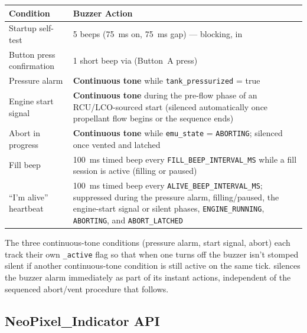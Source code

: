 ﻿\documentclass[11pt,letterpaper]{article}
\begin{document}
\begin{center}
\begin{tabularx}{\textwidth}{@{}lY@{}}
\toprule
Condition & Buzzer Action \\
\midrule
Startup self-test            & 5 beeps (75~ms on, 75~ms gap) --- blocking, in  \\
Button press confirmation    & 1 short beep via  (Button~A press) \\
Pressure alarm                & \textbf{Continuous tone} while \texttt{tank\_pressurized} = true \\
Engine start signal            & \textbf{Continuous tone} during the pre-flow phase of an RCU/LCO-sourced start (silenced automatically once propellant flow begins or the sequence ends) \\
Abort in progress              & \textbf{Continuous tone} while \texttt{emu\_state} = \texttt{ABORTING}; silenced once vented and latched \\
Fill beep                      & 100~ms timed beep every \texttt{FILL\_BEEP\_INTERVAL\_MS} while a fill session is active (filling or paused) \\
``I'm alive'' heartbeat        & 100~ms timed beep every \texttt{ALIVE\_BEEP\_INTERVAL\_MS}; suppressed during the pressure alarm, filling/paused, the engine-start signal or silent phases, \texttt{ENGINE\_RUNNING}, \texttt{ABORTING}, and \texttt{ABORT\_LATCHED} \\
\bottomrule
\end{tabularx}
\end{center}

The three continuous-tone conditions (pressure alarm, start signal, abort)
each track their own \texttt{\_active} flag so that when one turns off the
buzzer isn't stomped silent if another continuous-tone condition is still
active on the same tick.  silences the buzzer alarm
immediately as part of its instant actions, independent of the sequenced
abort/vent procedure that follows.

\subsection{NeoPixel\_Indicator API}
\end{document}

